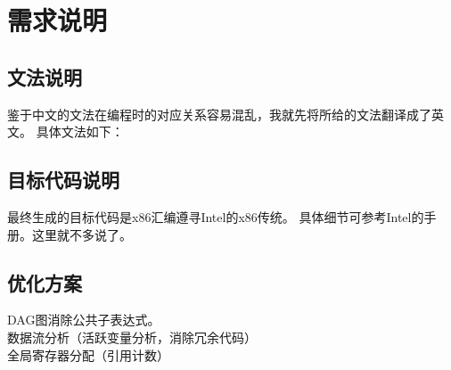 \section{需求说明}
\subsection{文法说明}
鉴于中文的文法在编程时的对应关系容易混乱，我就先将所给的文法翻译成了英文。
具体文法如下：

\subsection{目标代码说明}
最终生成的目标代码是x86汇编遵寻Intel的x86传统。
具体细节可参考Intel的手册。这里就不多说了。

\subsection{优化方案}
DAG图消除公共子表达式。\\
数据流分析（活跃变量分析，消除冗余代码）\\
全局寄存器分配（引用计数）
